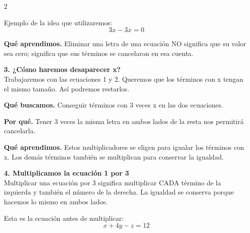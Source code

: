 \documentclass[11pt,a4paper,landscape]{article}
\begin{document}
\begin{multicols*}{2}
\begin{minipage}{\linewidth}
\par\smallskip Ejemplo de la idea que utilizaremos:
\[3x-3x=0\]
\par\smallskip\textbf{Qué aprendimos.} Eliminar una letra de una ecuación NO significa que su valor sea cero; significa que sus términos se cancelaron en esa cuenta.
\end{minipage}\par\medskip
\noindent\begin{minipage}{\linewidth}\textbf{3. ¿Cómo haremos desaparecer x?}\\[2pt]Trabajaremos con las ecuaciones 1 y 2. Queremos que los términos con x tengan el mismo tamaño. Así podremos restarlos.
\par\smallskip\textbf{Qué buscamos.} Conseguir términos con 3 veces x en las dos ecuaciones.
\par\smallskip\textbf{Por qué.} Tener 3 veces la misma letra en ambos lados de la resta nos permitirá cancelarla.
\par{}\par\smallskip
\par\smallskip\textbf{Qué aprendimos.} Estos multiplicadores se eligen para igualar los términos con x. Los demás términos también se multiplican para conservar la igualdad.
\end{minipage}\par\medskip
\noindent\begin{minipage}{\linewidth}\textbf{4. Multiplicamos la ecuación 1 por 3}\\[2pt]Multiplicar una ecuación por 3 significa multiplicar CADA término de la izquierda y también el número de la derecha. La igualdad se conserva porque hacemos lo mismo en ambos lados.
\par\smallskip Esta es la ecuación antes de multiplicar:
\[x + 4y - z = 12\]

\end{minipage}
\end{multicols*}
\end{document}
